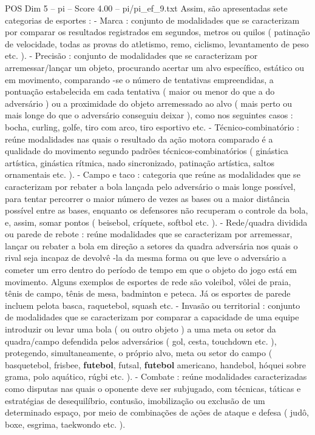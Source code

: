 \begin{textsample}{POS Dim 5 – pi – Score 4.00 – pi/pi\_ef\_9.txt}
Assim, são apresentadas sete categorias de esportes : - Marca : conjunto de modalidades que se caracterizam por comparar os resultados registrados em segundos, metros ou quilos ( patinação de velocidade, todas as provas do atletismo, remo, ciclismo, levantamento de peso etc. ). - Precisão : conjunto de modalidades que se caracterizam por arremessar/lançar um objeto, procurando acertar um alvo específico, estático ou em movimento, comparando -se o número de tentativas empreendidas, a pontuação estabelecida em cada tentativa ( maior ou menor do que a do adversário ) ou a proximidade do objeto arremessado ao alvo ( mais perto ou mais longe do que o adversário conseguiu deixar ), como nos seguintes casos : bocha, curling, golfe, tiro com arco, tiro esportivo etc. - Técnico-combinatório : reúne modalidades nas quais o resultado da ação motora comparado é a qualidade do movimento segundo padrões técnicos-combinatórios ( ginástica artística, ginástica rítmica, nado sincronizado, patinação artística, saltos ornamentais etc. ). - Campo e taco : categoria que reúne as modalidades que se caracterizam por rebater a bola lançada pelo adversário o mais longe possível, para tentar percorrer o maior número de vezes as bases ou a maior distância possível entre as bases, enquanto os defensores não recuperam o controle da bola, e, assim, somar pontos ( beisebol, críquete, softbol etc. ). - Rede/quadra dividida ou parede de rebote : reúne modalidades que se caracterizam por arremessar, lançar ou rebater a bola em direção a setores da quadra adversária nos quais o rival seja incapaz de devolvê -la da mesma forma ou que leve o adversário a cometer um erro dentro do período de tempo em que o objeto do jogo está em movimento.
Alguns exemplos de esportes de rede são voleibol, vôlei de praia, tênis de campo, tênis de mesa, badminton e peteca.
Já os esportes de parede incluem pelota basca, raquetebol, squash etc. - Invasão ou territorial : conjunto de modalidades que se caracterizam por comparar a capacidade de uma equipe introduzir ou levar uma bola ( ou outro objeto ) a uma meta ou setor da quadra/campo defendida pelos adversários ( gol, cesta, touchdown etc. ), protegendo, simultaneamente, o próprio alvo, meta ou setor do campo ( basquetebol, frisbee, \textbf{futebol}, futsal, \textbf{futebol} americano, handebol, hóquei sobre grama, polo aquático, rúgbi etc. ). - Combate : reúne modalidades caracterizadas como disputas nas quais o oponente deve ser subjugado, com técnicas, táticas e estratégias de desequilíbrio, contusão, imobilização ou exclusão de um determinado espaço, por meio de combinações de ações de ataque e defesa ( judô, boxe, esgrima, taekwondo etc. ).

\end{textsample}
